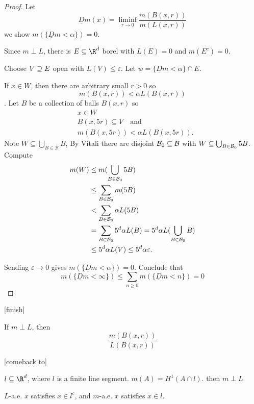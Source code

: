 \begin{proof}
Let
\[
	\underline{D} m(x) = \liminf_{r \to 0} \frac{m(B(x,r))}{m(L(x,r))}
\]
we show $m(\{ \underline{D} m < \alpha \}) = 0$.

Since $m \perp L$, there is $E \subseteq \R^d$ borel with $L(E) = 0$ and $m(E^c) = 0$.

Choose $V \supseteq E$ open with $L(V) \leq \varepsilon$. Let $w = \{ \underline{D} m < \alpha \} \cap E$.

If  $x \in W$, then there are arbitrary small  $r > 0$ so
\[
	m(B(x,r)) < \alpha L(B(x,r))
\].
Let $B$ be a collection of balls $B(x,r)$ so
\begin{align*}
	&x \in W \\
	&B(x,5r) \subseteq V \quad \text{and} \\
	&m(B(x,5r)) < \alpha L(B(x,5r)).
\end{align*}
Note $W \subseteq \bigcup_{B \in \mathcal{B}} B$, By Vitali there are disjoint
$\mathcal{B}_0 \subseteq \mathcal{B}$ with $W \subseteq \bigcup_{B \in \mathcal{B}_{0}} 5B$.
Compute
\begin{align*}
	m(W) &\leq m( \bigcup_{B \in \mathcal{B}_{0}} 5B) \\
		 &\leq \sum_{B \in \mathcal{B}_0} m(5B) \\
		 &< \sum_{B \in \mathcal{B}_{0}} \alpha L(5B) \\
		 &= \sum_{B \in \mathcal{B}_0} 5^d \alpha L(B) = 5^d \alpha L(\bigcup_{B \in \mathcal{B}_0} B) \\
		 &\leq 5^d \alpha L(V) \leq 5^d \alpha \varepsilon.
\end{align*}

Sending $\varepsilon \to 0$ gives $m(\{ \underline{D} m < \alpha \} ) = 0$.
Conclude that
 \[
	 m(\{ \underline{D} m < \infty\}) \leq \sum_{n \geq 0} m (\{ \underline{D} m < n \} ) = 0
\]
\end{proof}
[finish]

\begin{remark}
	If $m \perp L$, then
	\[
		\frac{m(B(x,r))}{L(B(x,r))}
	\]
\end{remark}
[comeback to]

\begin{example}
	$l \subseteq \R^d$, where $l$ is a finite line segment. $m(A) = H^1 (A \cap l)$.
	then  $m \perp L$
\end{example}

\begin{remark}
	$L$-a.e. $x$ satisfies $x \in l^c$, and $m$-a.e. $x$ satisfies $x \in l.$
\end{remark}


